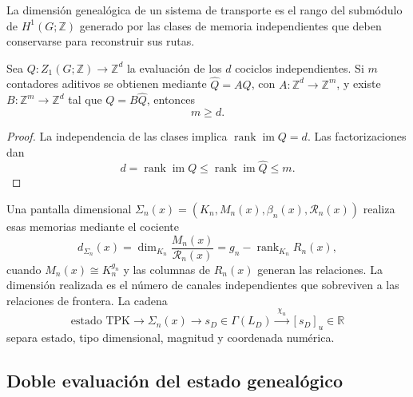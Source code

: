 \begin{definition}
La dimensión genealógica de un sistema de transporte es el rango del
submódulo de \(H^1(G;\mathbb Z)\) generado por las clases de memoria
independientes que deben conservarse para reconstruir sus rutas.
\end{definition}

\begin{theorem}
\label{thm:minimalidad-dimension-memoria}
Sea \(Q:Z_1(G;\mathbb Z)\to\mathbb Z^d\) la evaluación de los \(d\)
cociclos independientes. Si \(m\) contadores aditivos se obtienen mediante
\(\widehat Q=AQ\), con \(A:\mathbb Z^d\to\mathbb Z^m\), y existe
\(B:\mathbb Z^m\to\mathbb Z^d\) tal que \(Q=B\widehat Q\), entonces
\begin{equation}
 m\geq d.
 \label{eq:cota-rango-dimension}
\end{equation}
\end{theorem}

\begin{proof}
La independencia de las clases implica
\(\operatorname{rank}\operatorname{im}Q=d\). Las factorizaciones dan
\[
 d=\operatorname{rank}\operatorname{im}Q
 \leq\operatorname{rank}\operatorname{im}\widehat Q
 \leq m.
\]
\end{proof}

Una pantalla dimensional
\(\Sigma_n(x)=(K_n,M_n(x),\beta_n(x),\mathcal R_n(x))\) realiza esas
memorias mediante el cociente
\begin{equation}
 d_{\Sigma_n}(x)
 =\dim_{K_n}\frac{M_n(x)}{\mathcal R_n(x)}
 =g_n-\operatorname{rank}_{K_n}R_n(x),
 \label{eq:dimension-realizada-cociente}
\end{equation}
cuando \(M_n(x)\cong K_n^{g_n}\) y las columnas de \(R_n(x)\) generan las
relaciones. La dimensión realizada es el número de canales independientes
que sobreviven a las relaciones de frontera. La cadena
\begin{equation}
 \text{estado TPK}\longrightarrow\Sigma_n(x)
 \longrightarrow s_D\in\Gamma(L_D)
 \xrightarrow{\;\chi_u\;}[s_D]_u\in\mathbb R
 \label{eq:cadena-medicion-dimensional}
\end{equation}
separa estado, tipo dimensional, magnitud y coordenada numérica.

\subsection{Doble evaluación del estado genealógico}

